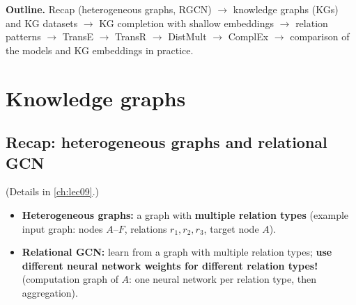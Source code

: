 \label{ch:lec10}

\providecommand{\vt}{\mathbf{t}}
\providecommand{\vg}{\mathbf{g}}
\providecommand{\C}{\mathbb{C}}
\providecommand{\cRe}{\operatorname{Re}}
\providecommand{\cIm}{\operatorname{Im}}
\providecommand{\Ker}{\operatorname{Ker}}
\providecommand{\cmark}{\textcolor{ForestGreen}{\checkmark}}
\providecommand{\xmark}{\textcolor{BrickRed}{$\boldsymbol{\times}$}}


\textbf{Outline.} Recap (heterogeneous graphs, RGCN) $\to$ knowledge graphs
(KGs) and KG datasets $\to$ KG completion with shallow embeddings $\to$ relation
patterns $\to$ TransE $\to$ TransR $\to$ DistMult $\to$ ComplEx $\to$ comparison
of the models and KG embeddings in practice.

\section{Knowledge graphs}\label{sec:lec10-kg}

\subsection{Recap: heterogeneous graphs and relational GCN}\label{sec:lec10-recap}

(Details in \cref{ch:lec09}.)
\begin{itemize}
  \item \textbf{Heterogeneous graphs:} a graph with \textbf{multiple relation
    types} (example input graph: nodes $A$--$F$, relations $r_1,r_2,r_3$, target
    node $A$).
  \item \textbf{Relational GCN:} learn from a graph with multiple relation types;
    \textbf{use different neural network weights for different relation types!}
    (computation graph of $A$: one neural network per relation type, then
    aggregation).
\end{itemize}

